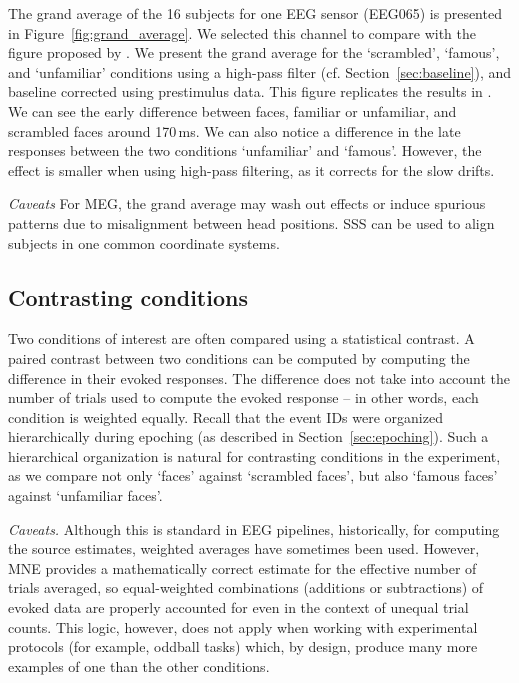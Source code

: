 The grand average of the 16 subjects for one EEG sensor (EEG065) is presented in Figure~\ref{fig:grand_average}. We selected this channel to compare with the figure proposed by \cite{wakeman2015multi}. We present the grand average for the `scrambled', `famous', and `unfamiliar' conditions using a high-pass filter (cf. Section~\ref{sec:baseline}), and baseline corrected using prestimulus data. This figure replicates the results in \citep{wakeman2015multi}. We can see the early difference between faces, familiar or unfamiliar, and scrambled faces around 170\,ms. We can also notice a difference in the late responses between the two conditions `unfamiliar' and `famous'. However, the effect is smaller when using high-pass filtering, as it corrects for the slow drifts.

\emph{Caveats} For MEG, the grand average may wash out effects or induce spurious patterns due to misalignment between head positions. SSS can be used to align subjects in one common coordinate systems.
    
\subsection{Contrasting conditions}

Two conditions of interest are often compared using a statistical contrast. A paired contrast between two conditions can be computed by computing the difference in their evoked responses. The difference does not take into account the number of trials used to compute the evoked response -- in other words, each condition is weighted equally. Recall that the event IDs were organized hierarchically during epoching (as described in Section~\ref{sec:epoching}). Such a hierarchical organization is natural for contrasting conditions in the experiment, as we compare not only `faces' against `scrambled faces', but also `famous faces' against `unfamiliar faces'.
    
\emph{Caveats.} Although this is standard in EEG pipelines, historically, for computing the source estimates, weighted averages have sometimes been used. However, MNE provides a mathematically correct estimate for the effective number of trials averaged, so equal-weighted combinations (additions or subtractions) of evoked data are properly accounted for even in the context of unequal trial counts. This logic, however, does not apply when working with experimental protocols (for example, oddball tasks) which, by design, produce many more examples of one than the other conditions.

